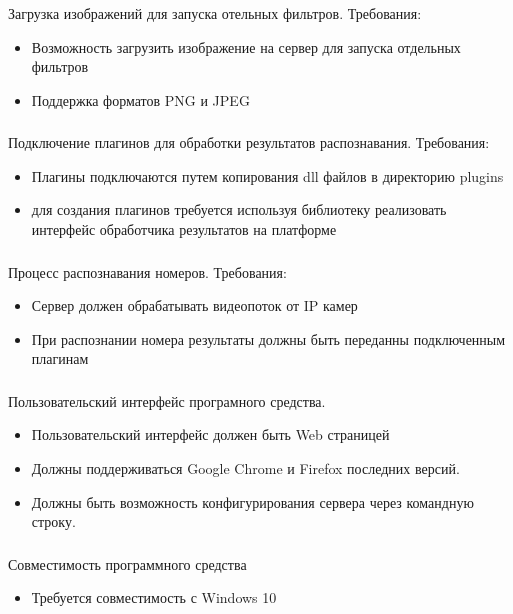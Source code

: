 \subsubsection{}
Загрузка изображений для запуска отельных фильтров. Требования:
\begin{itemize}
	\item Возможность загрузить изображение на сервер для запуска отдельных фильтров
	\item Поддержка форматов PNG и JPEG
\end{itemize}

\subsubsection{}
Подключение плагинов для обработки результатов распознавания. Требования:
\begin{itemize}
	\item Плагины подключаются путем копирования dll файлов в директорию plugins
	\item для создания плагинов требуется используя библиотеку реализовать интерфейс обработчика результатов на платформе \dotnet{}
\end{itemize}

\subsubsection{}
Процесс распознавания номеров. Требования:
\begin{itemize}
	\item Сервер должен обрабатывать видеопоток от IP камер
	\item При распознании номера результаты должны быть переданны подключенным плагинам
\end{itemize}

\subsubsection{}
Пользовательский интерфейс програмного средства.
\begin{itemize}
	\item Пользовательский интерфейс должен быть Web страницей
	\item Должны поддерживаться Google Chrome и Firefox последних версий.
	\item Должны быть возможность конфигурирования сервера через командную строку.
\end{itemize}

\subsubsection{}
Совместимость программного средства
\begin{itemize}
	\item Требуется совместимость с Windows 10
\end{itemize}
